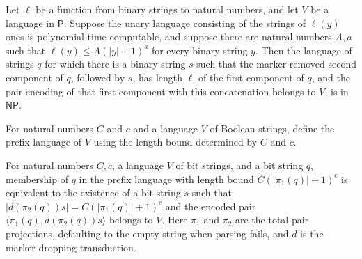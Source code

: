 \begin{theorem}
\label{Complexity.KarpLipton.prefixLangOf_mem_NP}
\leanok
{}
Let $\ell$ be a function from binary strings to natural numbers, and let $V$ be a
language in $\mathsf{P}$. Suppose the unary language consisting of the strings of
$\ell(y)$ ones is polynomial-time computable, and suppose there are natural numbers
$A,a$ such that $\ell(y)\le A(|y|+1)^a$ for every binary string $y$. Then the language
of strings $q$ for which there is a binary string $s$ such that the marker-removed
second component of $q$, followed by $s$, has length $\ell$ of the first component of
$q$, and the pair encoding of that first component with this concatenation belongs to
$V$, is in $\mathsf{NP}$.
\end{theorem}

\begin{definition}
\label{Complexity.KarpLipton.prefixLang}
\leanok
{}
For natural numbers $C$ and $c$ and a language $V$ of Boolean strings, define the prefix
language of $V$ using the length bound determined by $C$ and $c$.
\end{definition}

\begin{theorem}
\label{Complexity.KarpLipton.mem_prefixLang}
\leanok
{}
For natural numbers $C,c$, a language $V$ of bit strings, and a bit string $q$,
membership of $q$ in the prefix language with length bound $C(\lvert\pi_1(q)\rvert+1)^c$
is equivalent to the existence of a bit string $s$ such that $\lvert
d(\pi_2(q))s\rvert=C(\lvert\pi_1(q)\rvert+1)^c$ and the encoded pair
$\langle\pi_1(q),d(\pi_2(q))s\rangle$ belongs to $V$. Here $\pi_1$ and $\pi_2$ are the
total pair projections, defaulting to the empty string when parsing fails, and $d$ is
the marker-dropping transduction.
\end{theorem}

